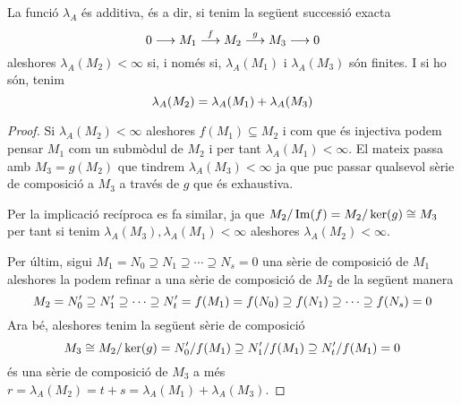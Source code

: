 \documentclass[../../../main.tex]{subfiles}
\begin{document}
\begin{prop}
\label{prop:funcioLambdaAdditiva} La funció $\lambda_A$ és additiva, és a dir, si tenim la següent successió exacta
\begin{equation}
    \notag
    0\longrightarrow M_1\overset{f}{\longrightarrow}M_2\overset{g}{\longrightarrow}M_3\longrightarrow 0
\end{equation}                          
aleshores $\lambda_A(M_2)<\infty$ si, i només si, $\lambda_A(M_1)$ i $\lambda_A(M_3)$ són finites. I si ho són, tenim 
\begin{equation}
    \notag
    \lambda_A(M_2) = \lambda_A(M_1)+\lambda_A(M_3)
\end{equation}
\end{prop}
\begin{proof}
Si $\lambda_A(M_2)<\infty$ aleshores $f(M_1)\subseteq M_2$ i com que és injectiva podem pensar $M_1$ com un submòdul de $M_2$ i per tant $\lambda_A(M_1)<\infty$. El mateix passa amb $M_3= g(M_2)$ que tindrem $\lambda_A(M_3)<\infty$ ja que puc passar qualsevol sèrie de composició a $M_3$ a través de $g$ que és exhaustiva.

Per la implicació recíproca es fa similar, ja que $M_2/\operatorname{Im}(f) = M_2/\ker(g)\cong M_3$ per tant si tenim $\lambda_A(M_3),\lambda_A(M_1)<\infty$ aleshores $\lambda_A(M_2)<\infty$.

Per últim, sigui $M_1 = N_0\supseteq N_1\supseteq \cdots\supseteq N_s = 0$ una sèrie de composició de $M_1$ aleshores la podem refinar a una sèrie de composició de $M_2$ de la següent manera
\begin{equation}
    \notag
    M_2 = N_0'\supseteq N_1'\supseteq\cdots\supseteq N_t' = f(M_1) = f(N_0)\supseteq f(N_1)\supseteq\cdots\supseteq f(N_s) = 0
\end{equation}
Ara bé, aleshores tenim la següent sèrie de composició
\begin{equation}
    \notag
    M_3\cong M_2/\ker(g) = N_0'/f(M_1)\supseteq N_1'/f(M_1)\supseteq N_t'/f(M_1) = 0
\end{equation}
és una sèrie de composició de $M_3$ a més $r = \lambda_A(M_2) = t+s = \lambda_A(M_1)+\lambda_A(M_3)$.
\end{proof}
\end{document}
